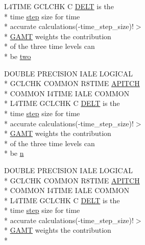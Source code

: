 \begin{DoxyCompactItemize}
L4\-T\-I\-M\-E G\-C\-L\-C\-H\-K C \hyperlink{time_8com_a5513a2d02244417f197860f9d142b7a4}{D\-E\-L\-T} is the \\*
time \hyperlink{time_8com_a91e550adb29e949f38f0252aa68aceed}{step} size for time \\*
accurate calculations(-\/time\-\_\-step\-\_\-size)!$>$\\*
 \hyperlink{time_8com_afdf546d0ac261dc8969599f6c2786ea3}{G\-A\-M\-T} weights the contribution \\*
of the three time levels can \\*
be \hyperlink{time_8com_a08a78256f7bf7006662ac6a5bf3eb786}{two}
\item 
D\-O\-U\-B\-L\-E P\-R\-E\-C\-I\-S\-I\-O\-N I\-A\-L\-E L\-O\-G\-I\-C\-A\-L \\*
G\-C\-L\-C\-H\-K C\-O\-M\-M\-O\-N R8\-T\-I\-M\-E \hyperlink{time_8com_a45717e5c9ccf2afd6bb9e4efe67c74e6}{A\-P\-I\-T\-C\-H} \\*
C\-O\-M\-M\-O\-N I4\-T\-I\-M\-E I\-A\-L\-E C\-O\-M\-M\-O\-N \\*
L4\-T\-I\-M\-E G\-C\-L\-C\-H\-K C \hyperlink{time_8com_a5513a2d02244417f197860f9d142b7a4}{D\-E\-L\-T} is the \\*
time \hyperlink{time_8com_a91e550adb29e949f38f0252aa68aceed}{step} size for time \\*
accurate calculations(-\/time\-\_\-step\-\_\-size)!$>$\\*
 \hyperlink{time_8com_afdf546d0ac261dc8969599f6c2786ea3}{G\-A\-M\-T} weights the contribution \\*
of the three time levels can \\*
be \hyperlink{time_8com_a59787df2891338b611ba3a1096154aa3}{n}
\item 
D\-O\-U\-B\-L\-E P\-R\-E\-C\-I\-S\-I\-O\-N I\-A\-L\-E L\-O\-G\-I\-C\-A\-L \\*
G\-C\-L\-C\-H\-K C\-O\-M\-M\-O\-N R8\-T\-I\-M\-E \hyperlink{time_8com_a45717e5c9ccf2afd6bb9e4efe67c74e6}{A\-P\-I\-T\-C\-H} \\*
C\-O\-M\-M\-O\-N I4\-T\-I\-M\-E I\-A\-L\-E C\-O\-M\-M\-O\-N \\*
L4\-T\-I\-M\-E G\-C\-L\-C\-H\-K C \hyperlink{time_8com_a5513a2d02244417f197860f9d142b7a4}{D\-E\-L\-T} is the \\*
time \hyperlink{time_8com_a91e550adb29e949f38f0252aa68aceed}{step} size for time \\*
accurate calculations(-\/time\-\_\-step\-\_\-size)!$>$\\*
 \hyperlink{time_8com_afdf546d0ac261dc8969599f6c2786ea3}{G\-A\-M\-T} weights the contribution \\*

\end{DoxyCompactItemize}
